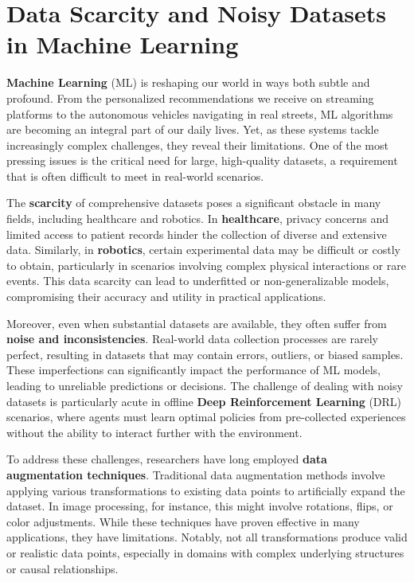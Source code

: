 \section{Data Scarcity and Noisy Datasets in Machine Learning}

\textbf{Machine Learning} (ML) is reshaping our world in ways both
subtle and profound. From the personalized recommendations we receive
on streaming platforms to the autonomous vehicles navigating in real streets,
ML algorithms are becoming an integral part of our daily lives.
Yet, as these systems tackle increasingly complex challenges,
they reveal their limitations.
One of the most pressing issues is the critical need for large, 
high-quality datasets, a requirement that is often difficult to
meet in real-world scenarios.

The \textbf{scarcity} of comprehensive datasets poses a significant
obstacle in many fields, including healthcare and robotics.
In \textbf{healthcare}, privacy concerns and limited access to patient
records hinder the collection of diverse and extensive data.
Similarly, in \textbf{robotics}, certain experimental data may be difficult
or costly to obtain, particularly in scenarios involving complex
physical interactions or rare events. This data scarcity can lead
to underfitted or non-generalizable models, compromising their
accuracy and utility in practical applications.

Moreover, even when substantial datasets are available, they
often suffer from \textbf{noise and inconsistencies}. Real-world data
collection processes are rarely perfect, resulting in datasets
that may contain errors, outliers, or biased samples.
These imperfections can significantly impact the performance of ML models,
leading to unreliable predictions or decisions. The challenge of dealing
with noisy datasets is particularly acute in offline
\textbf{Deep Reinforcement Learning} (DRL) scenarios, where agents must learn
optimal policies from pre-collected experiences without the ability
to interact further with the environment.

To address these challenges, researchers have long employed
\textbf{data augmentation techniques}. Traditional data augmentation
methods involve
applying various transformations to existing data points to artificially
expand the dataset. In image processing, for instance, this might involve
rotations, flips, or color adjustments. While these techniques have proven
effective in many applications, they have limitations.
Notably, not all transformations produce valid or realistic data points,
especially in domains with complex underlying structures or causal relationships.

